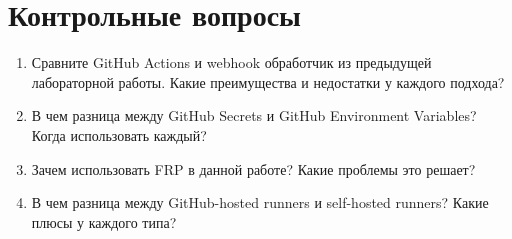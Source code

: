 \documentclass[12pt,a4paper]{article}
\begin{document}
\section{Контрольные вопросы}
\begin{enumerate}
    \item Сравните GitHub Actions и webhook обработчик из предыдущей лабораторной работы. Какие преимущества и недостатки у каждого подхода?
    \item В чем разница между GitHub Secrets и GitHub Environment Variables? Когда использовать каждый?
    \item Зачем использовать FRP в данной работе? Какие проблемы это решает?
    \item В чем разница между GitHub-hosted runners и self-hosted runners? Какие плюсы у каждого типа?
\end{enumerate}
\end{document}
